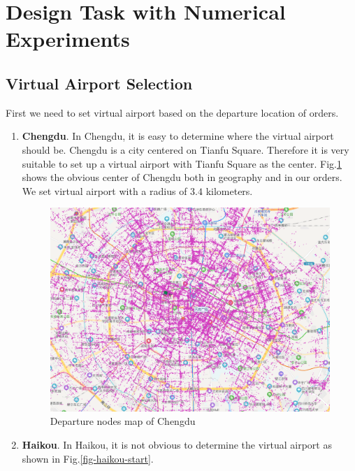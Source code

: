 \documentclass{llncs}
\begin{document}
\section{Design Task with Numerical Experiments}
\subsection{Virtual Airport Selection}
First we need to set virtual airport based on the departure location of orders.

\begin{enumerate}
	\item \textbf{Chengdu}. In Chengdu, it is easy to determine where the virtual airport should be. Chengdu is a city centered on Tianfu Square. Therefore it is very suitable to set up a virtual airport with Tianfu Square as the center. Fig.\ref{fig-chengdu-start} shows the obvious center of Chengdu both in geography and in our orders. We set virtual airport with a radius of $3.4$ kilometers.
	
		\begin{figure}[h]
		\centering
		\includegraphics[width=1\textwidth]{figures/chengdu_start.png}
		\caption{Departure nodes map of Chengdu}
		\label{fig-chengdu-start}
	    \end{figure}
 
 	\item \textbf{Haikou}. In Haikou, it is not obvious to determine the virtual airport as shown in Fig.\ref{fig-haikou-start}. 
 	

\end{enumerate}
\end{document}

